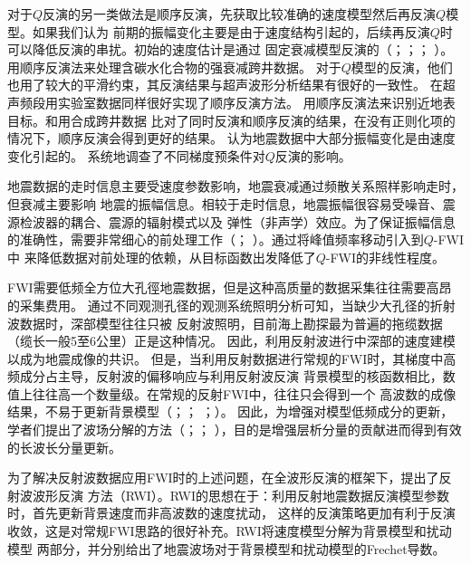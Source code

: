 对于$Q$反演的另一类做法是顺序反演，先获取比较准确的速度模型然后再反演$Q$模型。如果我们认为
前期的振幅变化主要是由于速度结构引起的，后续再反演$Q$时可以降低反演的串扰。初始的速度估计是通过
固定衰减模型反演的（；；；
）。用顺序反演法来处理含碳水化合物的强衰减跨井数据。
对于$Q$模型的反演，他们也用了较大的平滑约束，其反演结果与超声波形分析结果有很好的一致性。
在超声频段用实验室数据同样很好实现了顺序反演方法。
用顺序反演法来识别近地表目标。和用合成跨井数据
比对了同时反演和顺序反演的结果，在没有正则化项的情况下，顺序反演会得到更好的结果。
认为地震数据中大部分振幅变化是由速度变化引起的。
系统地调查了不同梯度预条件对$Q$反演的影响。

地震数据的走时信息主要受速度参数影响，地震衰减通过频散关系照样影响走时，但衰减主要影响
地震的振幅信息。相较于走时信息，地震振幅很容易受噪音、震源检波器的耦合、震源的辐射模式以及
弹性（非声学）效应。为了保证振幅信息的准确性，需要非常细心的前处理工作（；
）。通过将峰值频率移动引入到$Q$-FWI中
来降低数据对前处理的依赖，从目标函数出发降低了$Q$-FWI的非线性程度。

FWI需要低频全方位大孔徑地震数据，但是这种高质量的数据采集往往需要高昂的采集费用。
通过不同观测孔径的观测系统照明分析可知，当缺少大孔径的折射波数据时，深部模型往往只被
反射波照明，目前海上勘探最为普遍的拖缆数据（缆长一般5至6公里）正是这种情况。
因此，利用反射波进行中深部的速度建模以成为地震成像的共识。
但是，当利用反射数据进行常规的FWI时，其梯度中高频成分占主导，反射波的偏移响应与利用反射波反演
背景模型的核函数相比，数值上往往高一个数量级。在常规的反射FWI中，往往只会得到一个
高波数的成像结果，不易于更新背景模型（；；
；）。
因此，为增强对模型低频成分的更新，学者们提出了波场分解的方法（；；
），目的是增强层析分量的贡献进而得到有效的长波长分量更新。

为了解决反射波数据应用FWI时的上述问题，在全波形反演的框架下，提出了反射波波形反演
方法（RWI）。RWI的思想在于：利用反射地震数据反演模型参数时，首先更新背景速度而非高波数的速度扰动，
这样的反演策略更加有利于反演收敛，这是对常规FWI思路的很好补充。RWI将速度模型分解为背景模型和扰动模型
两部分，并分别给出了地震波场对于背景模型和扰动模型的Frechet导数。

